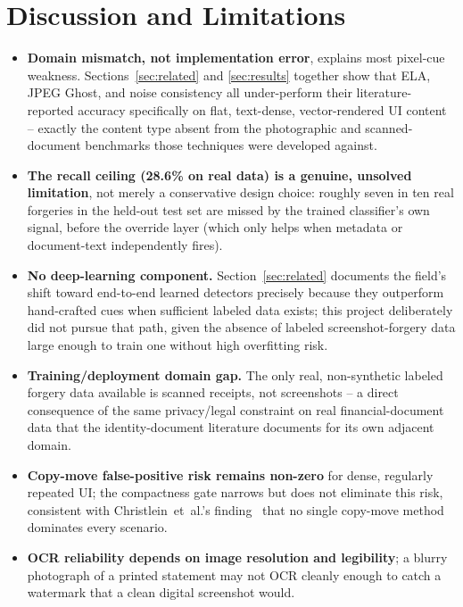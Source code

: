 \documentclass[conference]{IEEEtran}
\begin{document}
\section{Discussion and Limitations}
\label{sec:discussion}

\begin{itemize}
\item \textbf{Domain mismatch, not implementation error}, explains most
pixel-cue weakness. Sections~\ref{sec:related} and \ref{sec:results} together
show that ELA, JPEG Ghost, and noise consistency all under-perform their
literature-reported accuracy specifically on flat, text-dense, vector-rendered
UI content -- exactly the content type absent from the photographic and
scanned-document benchmarks those techniques were developed against.
\item \textbf{The recall ceiling (28.6\% on real data) is a genuine,
unsolved limitation}, not merely a conservative design choice: roughly seven
in ten real forgeries in the held-out test set are missed by the trained
classifier's own signal, before the override layer (which only helps when
metadata or document-text independently fires).
\item \textbf{No deep-learning component.} Section~\ref{sec:related}
documents the field's shift toward end-to-end learned detectors precisely
because they outperform hand-crafted cues when sufficient labeled data
exists; this project deliberately did not pursue that path, given the
absence of labeled screenshot-forgery data large enough to train one without
high overfitting risk.
\item \textbf{Training/deployment domain gap.} The only real, non-synthetic
labeled forgery data available is scanned receipts, not screenshots -- a
direct consequence of the same privacy/legal constraint on real
financial-document data that the identity-document literature documents for
its own adjacent domain.
\item \textbf{Copy-move false-positive risk remains non-zero} for dense,
regularly repeated UI; the compactness gate narrows but does not eliminate
this risk, consistent with Christlein~et~al.'s finding~\cite{christlein2012evaluation}
that no single copy-move method dominates every scenario.
\item \textbf{OCR reliability depends on image resolution and legibility}; a
blurry photograph of a printed statement may not OCR cleanly enough to catch
a watermark that a clean digital screenshot would.
\end{itemize}
\end{document}
